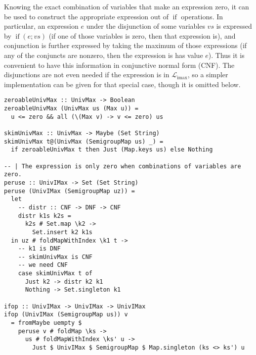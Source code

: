 \documentclass[11pt, twoside, reqno]{book}
\DeclareMathOperator{\imax}{imax}
\DeclareMathOperator{\ifop}{if}
\begin{document}
Knowing the exact combination of variables that make an expression zero, it can be used to construct the appropriate expression out of \(\ifop\) operations.
In particular, an expression \(e\) under the disjunction of some variables \(vs\) is expressed by \(\ifop(e; vs)\) (if one of those variables is zero, then that expression is), and conjunction is further expressed by taking the maximum of those expressions (if any of the conjuncts are nonzero, then the expression is has value \(e\)).
Thus it is convenient to have this information in conjunctive normal form (CNF).
The disjunctions are not even needed if the expression is in \(\mathcal{L}_{\imax}\), so a simpler implementation can be given for that special case, though it is omitted below.

\begin{verbatim}
zeroableUnivMax :: UnivMax -> Boolean
zeroableUnivMax (UnivMax us (Max u)) =
  u <= zero && all (\(Max v) -> v <= zero) us

skimUnivMax :: UnivMax -> Maybe (Set String)
skimUnivMax t@(UnivMax (SemigroupMap us) _) =
  if zeroableUnivMax t then Just (Map.keys us) else Nothing

-- | The expression is only zero when combinations of variables are zero.
peruse :: UnivIMax -> Set (Set String)
peruse (UnivIMax (SemigroupMap uz)) =
  let
    -- distr :: CNF -> DNF -> CNF
    distr k1s k2s =
      k2s # Set.map \k2 ->
        Set.insert k2 k1s
  in uz # foldMapWithIndex \k1 t ->
    -- k1 is DNF
    -- skimUnivMax is CNF
    -- we need CNF
    case skimUnivMax t of
      Just k2 -> distr k2 k1
      Nothing -> Set.singleton k1

ifop :: UnivIMax -> UnivIMax -> UnivIMax
ifop (UnivIMax (SemigroupMap us)) v
  = fromMaybe uempty $
    peruse v # foldMap \ks ->
      us # foldMapWithIndex \ks' u ->
        Just $ UnivIMax $ SemigroupMap $ Map.singleton (ks <> ks') u
\end{verbatim}




%
%
\end{document}
